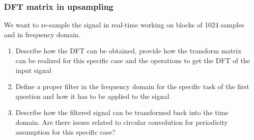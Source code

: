     \subsubsection{DFT matrix in upsampling}
    We want to re-sample the signal in real-time working on blocks of 1024 samples and in frequency domain.
    \begin{enumerate}
        \item Describe how the DFT can be obtained, provide how the transform matrix can be realized for this specific case and the operations to get the DFT of the input signal
        \item Define a proper filter in the frequency domain for the specific task of the first question and how it has to be applied to the signal
        \item Describe how the filtered signal can be transformed back into the time domain. Are there issues related to circular convolution for periodicity assumption for this specific case?
    \end{enumerate}
